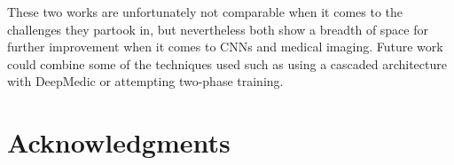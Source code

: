 \documentclass{sig-alternate}
\begin{document}
These two works are unfortunately not comparable when it comes to the challenges they partook in, but nevertheless both show a breadth of space for further improvement when it comes to CNNs and medical imaging. Future work could combine some of the techniques used such as using a cascaded architecture with DeepMedic or attempting two-phase training.


\section*{Acknowledgments}
\label{sec:acknowledgments}



  
\end{document}
